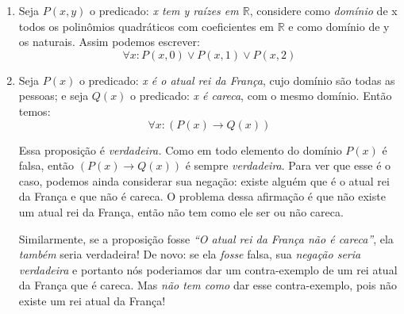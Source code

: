 \documentclass{article}
\begin{document}
\begin{enumerate}
    \item Seja \( P(x,y) \) o predicado: \textit{x tem y raízes em \( \mathbb{R} \)}, considere como \textit{domínio} de x todos os polinômios quadráticos com coeficientes em \( \mathbb{R} \) e como domínio de y os naturais. Assim podemos escrever:
        \[ \forall x : P(x,0) \lor P(x,1) \lor P(x,2) \]

    \item Seja \( P(x) \) o predicado: \textit{x é o atual rei da França}, cujo domínio são todas as pessoas; e seja \( Q(x) \) o predicado: \textit{x é careca}, com o mesmo domínio. Então temos:
        \[ \forall x : (P(x) \to Q(x)) \]

        Essa proposição é \textit{verdadeira.} Como em todo elemento do domínio \( P(x) \) é falsa, então \( (P(x) \to Q(x)) \) é sempre \textit{verdadeira}. Para ver que esse é o caso, podemos ainda considerar sua negação: existe alguém que é o atual rei da França e que não é careca. O problema dessa afirmação é que não existe um atual rei da França, então não tem como ele ser ou não careca.

        Similarmente, se a proposição fosse \textit{``O atual rei da França não é careca''}, ela \textit{também} seria verdadeira! De novo: se ela \textit{fosse} falsa, sua \textit{negação seria verdadeira} e portanto nós poderiamos dar um contra-exemplo de um rei atual da França que é careca. Mas \textit{não tem como} dar esse contra-exemplo, pois não existe um rei atual da França!

\end{enumerate}
\end{document}
